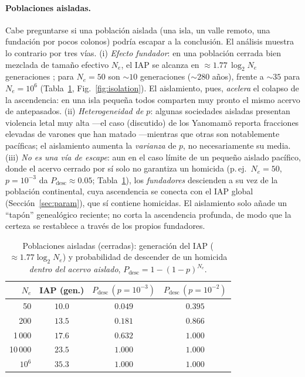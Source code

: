 \documentclass[11pt]{article}
\begin{document}
\paragraph{Poblaciones aisladas.} Cabe preguntarse si una poblaci\'on aislada
(una isla, un valle remoto, una fundaci\'on por pocos colonos) podr\'ia escapar a
la conclusi\'on. El an\'alisis muestra lo contrario por tres v\'ias. (i)
\emph{Efecto fundador}: en una poblaci\'on cerrada bien mezclada de tama\~no
efectivo $N_e$, el IAP se alcanza en $\approx 1{.}77\,\log_2 N_e$ generaciones
\citep{chang1999}; para $N_e=50$ son $\sim 10$ generaciones ($\sim 280$ a\~nos),
frente a $\sim 35$ para $N_e=10^{6}$ (Tabla~\ref{tab:island}, Fig.~\ref{fig:isolation}).
El aislamiento, pues, \emph{acelera} el colapso de la ascendencia: en una isla
peque\~na todos comparten muy pronto el mismo acervo de antepasados. (ii)
\emph{Heterogeneidad de $p$}: algunas sociedades aisladas presentan violencia
letal muy alta \citep{keeley1996}---el caso (discutido) de los Yanomam\"o reporta
fracciones elevadas de varones que han matado \citep{chagnon1988}---mientras que
otras son notablemente pac\'ificas; el aislamiento aumenta la \emph{varianza} de
$p$, no necesariamente su media. (iii) \emph{No es una v\'ia de escape}: aun en el
caso l\'imite de un peque\~no aislado pac\'ifico, donde el acervo cerrado por
s\'i solo no garantiza un homicida (p.\,ej.\ $N_e=50$, $p=10^{-3}$ da
$P_{\text{desc}}\approx 0{.}05$; Tabla~\ref{tab:island}), los \emph{fundadores}
descienden a su vez de la poblaci\'on continental, cuya ascendencia se conecta con
el IAP global (Secci\'on~\ref{sec:param}), que s\'i contiene homicidas. El
aislamiento solo a\~nade un ``tap\'on'' geneal\'ogico reciente; no corta la
ascendencia profunda, de modo que la certeza se restablece a trav\'es de los
propios fundadores.

\begin{table}[h]
\centering
\caption{Poblaciones aisladas (cerradas): generaci\'on del IAP
($\approx 1{.}77\log_2 N_e$) y probabilidad de descender de un homicida
\emph{dentro del acervo aislado}, $P_{\text{desc}}=1-(1-p)^{N_e}$.}
\label{tab:island}
\begin{tabular}{rccc}
\toprule
$N_e$ & IAP (gen.) & $P_{\text{desc}}\,(p{=}10^{-3})$ & $P_{\text{desc}}\,(p{=}10^{-2})$ \\
\midrule
50      & $10{.}0$ & $0{.}049$ & $0{.}395$ \\
200     & $13{.}5$ & $0{.}181$ & $0{.}866$ \\
1\,000  & $17{.}6$ & $0{.}632$ & $1{.}000$ \\
10\,000 & $23{.}5$ & $1{.}000$ & $1{.}000$ \\
$10^{6}$ & $35{.}3$ & $1{.}000$ & $1{.}000$ \\
\bottomrule
\end{tabular}
\end{table}
\end{document}
